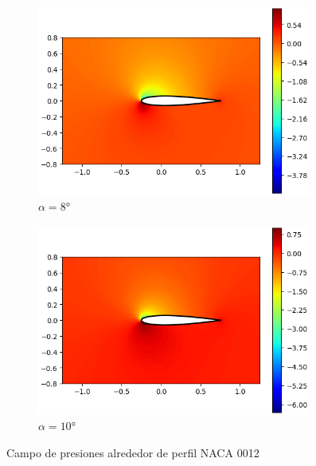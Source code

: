 \documentclass[letterpaper, openright, 12pt]{book}
\begin{document}
\begin{figure}[htbp!]
\begin{subfigure}[c]{0.48\textwidth}
            \includegraphics[keepaspectratio, width=0.99\textwidth]
                {./img/potential_flow_cp_8}
            \caption{$\alpha = 8\si{\degree}$}
            \label{fig:potential_flow_cp_8}
        \end{subfigure}
        \hfill
        \begin{subfigure}[c]{0.48\textwidth}
            \includegraphics[keepaspectratio, width=0.99\textwidth]
                {./img/potential_flow_cp_10}
            \caption{$\alpha = 10\si{\degree}$}
        \end{subfigure}
        \caption{Campo de presiones alrededor de perfil NACA 0012}
        \label{fig:potential_flow_cp__1}
    \end{figure}
\end{document}
